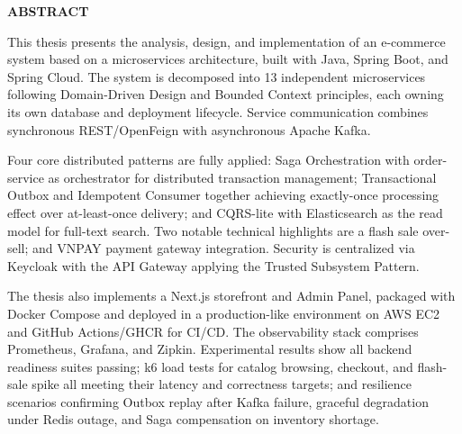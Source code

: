 \documentclass[../DoAn.tex]{subfiles}
\begin{document}
\begin{center}
    \Large{\textbf{ABSTRACT}}\\
\end{center}
\vspace{1cm}

This thesis presents the analysis, design, and implementation of an e-commerce system based on
a microservices architecture, built with Java, Spring Boot, and Spring Cloud. The
system is decomposed into 13 independent microservices following Domain-Driven Design and Bounded
Context principles, each owning its own database and deployment lifecycle. Service communication
combines synchronous REST/OpenFeign with asynchronous Apache Kafka.

Four core distributed patterns are fully applied: Saga Orchestration with order-service as
orchestrator for distributed transaction management; Transactional Outbox and Idempotent Consumer
together achieving exactly-once processing effect over at-least-once delivery; and CQRS-lite with
Elasticsearch as the read model for full-text search. Two notable technical highlights are a
flash sale over-sell; and VNPAY payment gateway integration. Security is centralized via Keycloak
with the API Gateway applying the Trusted Subsystem Pattern.

The thesis also implements a Next.js storefront and Admin Panel, packaged with Docker Compose
and deployed in a production-like environment on AWS EC2 and
GitHub Actions/GHCR for CI/CD. The observability stack comprises Prometheus, Grafana, and
Zipkin. Experimental results show all backend readiness suites passing; k6 load tests for
catalog browsing, checkout, and flash-sale spike all meeting their latency and correctness
targets; and resilience scenarios confirming Outbox replay after Kafka failure, graceful
degradation under Redis outage, and Saga compensation on inventory shortage.

\vspace{1cm}

\end{document}
